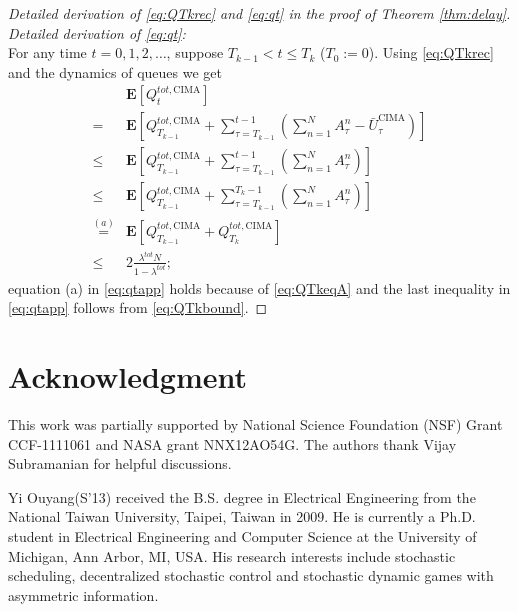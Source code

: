 \documentclass[onecolumn,draftcls]{IEEEtran}
\newcommand{\g}{\text{CIMA}}
\begin{document}
\begin{proof}[Detailed derivation of \eqref{eq:QTkrec} and \eqref{eq:qt}  in the proof of Theorem \ref{thm:delay}]
\textit{Detailed derivation of \eqref{eq:qt}:}
\\
For any time $t=0,1,2,\dots$, suppose $ T_{k-1} < t \leq T_{k} $ ($T_0:= 0$). Using \eqref{eq:QTkrec} and the dynamics of queues we get
\begin{align}
&\mathbf{E}\left[Q^{tot,\g}_{t}\right] \nonumber\\
= & 
\mathbf{E}\left[Q^{tot,\g}_{T_{k-1}} + \sum_{\tau=T_{k-1}}^{t-1}\left(\sum_{n=1}^N A^n_{\tau} - \bar{U}^\g_{\tau}\right)\right] \nonumber\\
\leq & 
\mathbf{E}\left[Q^{tot,\g}_{T_{k-1}} + \sum_{\tau=T_{k-1}}^{t-1}\left(\sum_{n=1}^N A^n_{\tau} \right)\right] \nonumber\\
\leq & 
\mathbf{E}\left[Q^{tot,\g}_{T_{k-1}} + \sum_{\tau=T_{k-1}}^{T_{k}-1}\left(\sum_{n=1}^N A^n_{\tau} \right)\right] \nonumber\\
\stackrel{(a)}{=} & 
\mathbf{E}\left[Q^{tot,\g}_{T_{k-1}} + Q^{tot,\g}_{T_{k}}\right] \nonumber\\
\leq & 2 \frac{\lambda^{tot} N}{1-\lambda^{tot}};
\label{eq:qtapp}
\end{align}
equation (a) in \eqref{eq:qtapp} holds because of \eqref{eq:QTkeqA} and the last inequality in \eqref{eq:qtapp} follows from \eqref{eq:QTkbound}.


\end{proof}



\section*{Acknowledgment}
This work was partially supported by National Science Foundation (NSF) Grant CCF-1111061 and NASA grant NNX12AO54G.
The authors thank Vijay Subramanian for helpful discussions.


\ifCLASSOPTIONcaptionsoff
  \newpage
\fi













\begin{IEEEbiographynophoto}{Yi Ouyang}(S'13)
received the B.S. degree in Electrical Engineering from the National Taiwan University, Taipei, Taiwan in 2009.
He is currently a Ph.D. student in Electrical Engineering and Computer Science at the University of Michigan, Ann Arbor, MI, USA.
His research interests include stochastic scheduling, decentralized stochastic control and stochastic dynamic games with asymmetric information.

\end{IEEEbiographynophoto}
\end{document}
